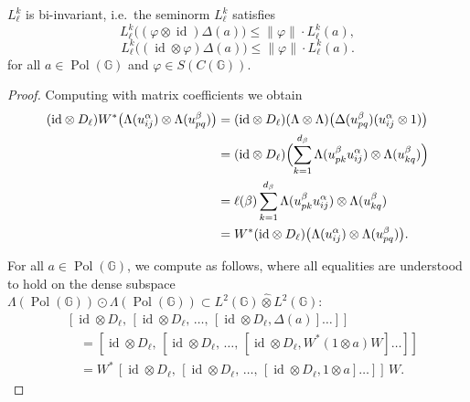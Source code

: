 \documentclass[10pt,a4paper]{amsart}
\begin{document}
\begin{lemma}\label{lemma left}
\(L_\ell^k\) is bi-invariant, i.e.\ the seminorm \(L_\ell^k\) satisfies
\[
L_\ell^k\bigl((\varphi \otimes \operatorname{id})\Delta(a)\bigr) 
\le \|\varphi\| \cdot L_\ell^k(a),
\]
\[L_\ell^k\bigl(( \operatorname{id}\otimes\varphi)\Delta(a)\bigr) 
\le \|\varphi\| \cdot L_\ell^k(a).
\]
for all \(a \in \operatorname{Pol}(\mathbb{G})\) and 
\(\varphi \in S(C(\mathbb{G}))\).
\end{lemma}

\begin{proof}
Computing with matrix coefficients we obtain
\begin{align*}
(\mathrm{id} \otimes D_{\ell}) W^{*}\bigl(\Lambda(u_{ij}^{\alpha}) \otimes \Lambda(u_{pq}^{\beta})\bigr) 
&= (\mathrm{id} \otimes D_{\ell})(\Lambda \otimes \Lambda)
   \bigl(\Delta(u_{pq}^{\beta})(u_{ij}^{\alpha} \otimes 1)\bigr) \\
&= (\mathrm{id} \otimes D_{\ell})\Bigl( \sum_{k=1}^{d_{\beta}} 
   \Lambda(u_{pk}^{\beta} u_{ij}^{\alpha}) \otimes \Lambda(u_{kq}^{\beta}) \Bigr) \\
&= \ell(\beta) \sum_{k=1}^{d_{\beta}} \Lambda(u_{pk}^{\beta} u_{ij}^{\alpha}) \otimes \Lambda(u_{kq}^{\beta}) \\
&= W^{*}(\mathrm{id} \otimes D_{\ell}) \bigl(\Lambda(u_{ij}^{\alpha}) \otimes \Lambda(u_{pq}^{\beta})\bigr).
\end{align*}

For all \(a \in \operatorname{Pol}(\mathbb{G})\), we compute as follows, where all 
equalities are understood to hold on the dense subspace 
\(\Lambda(\operatorname{Pol}(\mathbb{G})) \odot \Lambda(\operatorname{Pol}(\mathbb{G}))
\subset L^2(\mathbb{G}) \hat\otimes L^2(\mathbb{G})\):
\[
\begin{aligned}
&[\operatorname{id} \otimes D_\ell,\,
 [\operatorname{id} \otimes D_\ell,\,
  \dots,\,
 [\operatorname{id} \otimes D_\ell, \Delta(a)]\dots]] \\
&\quad = [\operatorname{id} \otimes D_\ell,\,
 [\operatorname{id} \otimes D_\ell,\,
  \dots,\,
 [\operatorname{id} \otimes D_\ell, W^*(1\otimes a)W]\dots]] \\
&\quad = W^*\,[\operatorname{id} \otimes D_\ell,\,
 [\operatorname{id} \otimes D_\ell,\,
  \dots,\,
 [\operatorname{id} \otimes D_\ell, 1\otimes a]\dots]]\,W.
\end{aligned}
\]


\end{proof}
\end{document}
